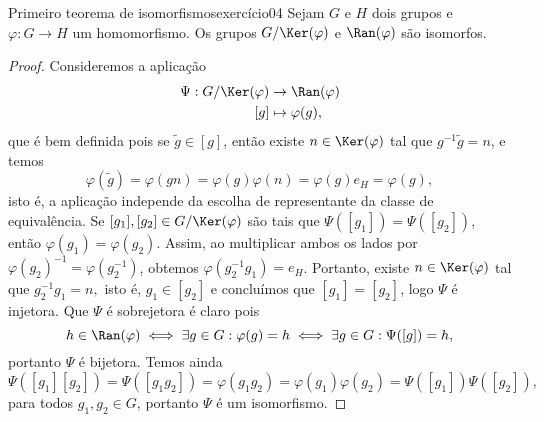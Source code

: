 \begin{proposition}{Primeiro teorema de isomorfismos}{exercício04}
    Sejam \(G\) e \(H\) dois grupos e \(\varphi : G \to H\) um homomorfismo. Os grupos \(G/\Ker(\varphi)\) e \(\Ran(\varphi)\) são isomorfos.
\end{proposition}
\begin{proof}
    Consideremos a aplicação
    \begin{align*}
        \Psi : G/\Ker(\varphi) &\to \Ran(\varphi)\\
                           [g] &\mapsto \varphi(g),
    \end{align*}
    que é bem definida pois se \(\tilde{g} \in [g]\), então existe \(n \in \Ker(\varphi)\) tal que \(g^{-1}\tilde{g} = n\), e temos
    \begin{equation*}
        \varphi(\tilde{g}) = \varphi(gn) = \varphi(g)\varphi(n) = \varphi(g)e_H = \varphi(g),
    \end{equation*}
    isto é, a aplicação independe da escolha de representante da classe de equivalência. Se \([g_1], [g_2] \in G/\Ker(\varphi)\) são tais que \(\Psi([g_1]) = \Psi([g_2])\), então \(\varphi(g_1) = \varphi(g_2)\). Assim, ao multiplicar ambos os lados por \(\varphi(g_2)^{-1} = \varphi(g_2^{-1})\), obtemos \(\varphi(g_2^{-1}g_1) = e_H\). Portanto, existe \(n \in \Ker(\varphi)\) tal que \(g_2^{-1}g_1 = n,\) isto é, \(g_1 \in [g_2]\) e concluímos que \([g_1] = [g_2]\), logo \(\Psi\) é injetora. Que \(\Psi\) é sobrejetora é claro pois
    \begin{equation*}
        h \in \Ran(\varphi) \iff \exists g \in G : \varphi(g) = h \iff \exists g \in G : \Psi([g]) = h,
    \end{equation*}
    portanto \(\Psi\) é bijetora. Temos ainda
    \begin{equation*}
        \Psi([g_1][g_2]) = \Psi([g_1g_2]) = \varphi(g_1g_2) = \varphi(g_1)\varphi(g_2) = \Psi([g_1])\Psi([g_2]),
    \end{equation*}
    para todos \(g_1, g_2 \in G\), portanto \(\Psi\) é um isomorfismo.
\end{proof}
